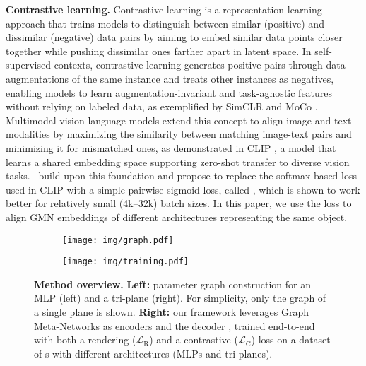\textbf{Contrastive learning.} 
Contrastive learning is a representation learning approach that trains models to distinguish between similar (positive) and dissimilar (negative) data pairs by aiming to embed similar data points closer together while pushing dissimilar ones farther apart in latent space. In self-supervised contexts, contrastive learning generates positive pairs through data augmentations of the same instance and treats other instances as negatives, enabling models to learn augmentation-invariant and task-agnostic features without relying on labeled data, as exemplified by SimCLR \cite{chen2020simple} and MoCo \cite{he2020momentum}. Multimodal vision-language models extend this concept to align image and text modalities by maximizing the similarity between matching image-text pairs and minimizing it for mismatched ones, as demonstrated in CLIP \cite{radford2021learning}, a model that learns a shared embedding space supporting zero-shot transfer to diverse vision tasks. \citealp{zhai2023sigmoid}\ build upon this foundation and propose to replace the softmax-based loss used in CLIP with a simple pairwise sigmoid loss, called \siglip{}, which is shown to work better for relatively small (4k--32k) batch sizes. In this paper, we use the \siglip{} loss to align GMN embeddings of different \nerf{} architectures representing the same object.

\begin{figure*}[t]
    \centering
    \begin{subfigure}[b]{0.32\linewidth}
        \centering
        \texttt{[image: img/graph.pdf]}
    \end{subfigure}
    \qquad
    \begin{subfigure}[b]{0.52\linewidth}
        \centering
        \texttt{[image: img/training.pdf]}
    \end{subfigure}
    \caption{\textbf{Method overview.} \textbf{Left:} parameter graph construction \cite{lim2024graph} for an MLP (left) and a tri-plane (right). For simplicity, only the graph of a single plane is shown. \textbf{Right:} our framework leverages Graph Meta-Networks \cite{lim2024graph} as encoders and the \nftovec{} decoder \cite{ramirez2024deep}, trained end-to-end with both a rendering ($\mathcal{L}_\text{R}$) and a contrastive ($\mathcal{L}_\text{C}$) loss on a dataset of \nerf{}s with different architectures (MLPs and tri-planes).}
    \label{fig:method}
\end{figure*}